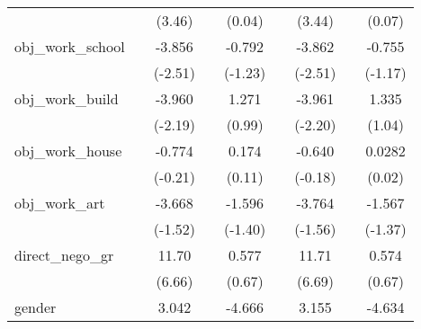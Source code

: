 {\begin{tabular}{l*{8}{c}}
            &                     &      (3.46)         &                     &      (0.04)         &                     &      (3.44)         &                     &      (0.07)         \\
[1em]
obj\_work\_school&                     &      -3.856\sym{*}  &                     &      -0.792         &                     &      -3.862\sym{*}  &                     &      -0.755         \\
            &                     &     (-2.51)         &                     &     (-1.23)         &                     &     (-2.51)         &                     &     (-1.17)         \\
[1em]
obj\_work\_build&                     &      -3.960\sym{*}  &                     &       1.271         &                     &      -3.961\sym{*}  &                     &       1.335         \\
            &                     &     (-2.19)         &                     &      (0.99)         &                     &     (-2.20)         &                     &      (1.04)         \\
[1em]
obj\_work\_house&                     &      -0.774         &                     &       0.174         &                     &      -0.640         &                     &      0.0282         \\
            &                     &     (-0.21)         &                     &      (0.11)         &                     &     (-0.18)         &                     &      (0.02)         \\
[1em]
obj\_work\_art&                     &      -3.668         &                     &      -1.596         &                     &      -3.764         &                     &      -1.567         \\
            &                     &     (-1.52)         &                     &     (-1.40)         &                     &     (-1.56)         &                     &     (-1.37)         \\
[1em]
direct\_nego\_gr&                     &       11.70\sym{***}&                     &       0.577         &                     &       11.71\sym{***}&                     &       0.574         \\
            &                     &      (6.66)         &                     &      (0.67)         &                     &      (6.69)         &                     &      (0.67)         \\
[1em]
gender      &                     &       3.042         &                     &      -4.666\sym{*}  &                     &       3.155         &                     &      -4.634\sym{*}  \\

\end{tabular}}
